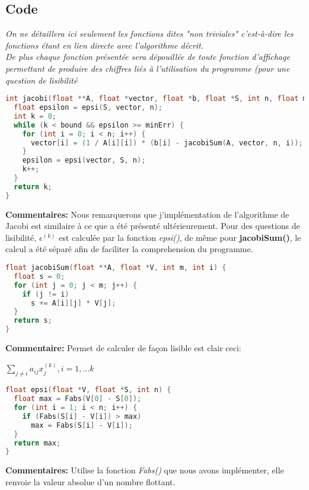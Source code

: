 \documentclass{report}
\begin{document}
\subsection{Code}
\textit{On ne détaillera ici seulement les fonctions dites "non triviales" c'est-à-dire les fonctions étant en lien directe avec l'algorithme décrit.\\De plus chaque fonction présentée sera dépouillée de toute fonction d'affichage permettant de produire des chiffres liés à l'utilisation du programme (pour une question de lisibilité}
\begin{lstlisting}[language=C,inputencoding=utf8, basicstyle=\fontsize{8}{10}\selectfont,caption=jacobi.c]
int jacobi(float **A, float *vector, float *b, float *S, int n, float minErr,int bound) {
  float epsilon = epsi(S, vector, n);
  int k = 0;
  while (k < bound && epsilon >= minErr) {
    for (int i = 0; i < n; i++) {
      vector[i] = (1 / A[i][i]) * (b[i] - jacobiSum(A, vector, n, i));
    }
    epsilon = epsi(vector, S, n);
    k++;
  }
  return k;
}
\end{lstlisting}
\textbf{Commentaires:} Nous remarquerons que j'implémentation de l'algorithme de Jacobi est similaire à ce que a été présenté ultérieurement. Pour des questions de lisibilité, $\epsilon^{(k)}$ est calculée par la fonction \textit{epsi()}, de même pour \textbf{jacobiSum()}, le calcul a été séparé afin de faciliter la comprehension du programme.
\begin{lstlisting}[language=C,inputencoding=utf8, basicstyle=\fontsize{8}{10}\selectfont,caption=jacobiSum() function in "source.h"]
float jacobiSum(float **A, float *V, int m, int i) {
  float s = 0;
  for (int j = 0; j < m; j++) {
    if (j != i)
      s += A[i][j] * V[j];
  }
  return s;
}
\end{lstlisting}
\textbf{Commentaire:} Permet de calculer de façon lisible est clair ceci: \\
\begin{center}
$\sum \limits_{j \neq i} a_{ij}x_j^{(k)}, i=1,\ldots k$
\end{center}
\begin{lstlisting}[language=C,inputencoding=utf8, basicstyle=\fontsize{8}{10}\selectfont,caption=epsi() function in "source.h"]
float epsi(float *V, float *S, int n) {
  float max = Fabs(V[0] - S[0]);
  for (int i = 1; i < n; i++) {
    if (Fabs(S[i] - V[i]) > max)
      max = Fabs(S[i] - V[i]);
  }
  return max;
}
\end{lstlisting}
\textbf{Commentaires:} Utilise la fonction \textit{Fabs()} que nous avons implémenter, elle renvoie la valeur absolue d'un nombre flottant.\\
\end{document}
